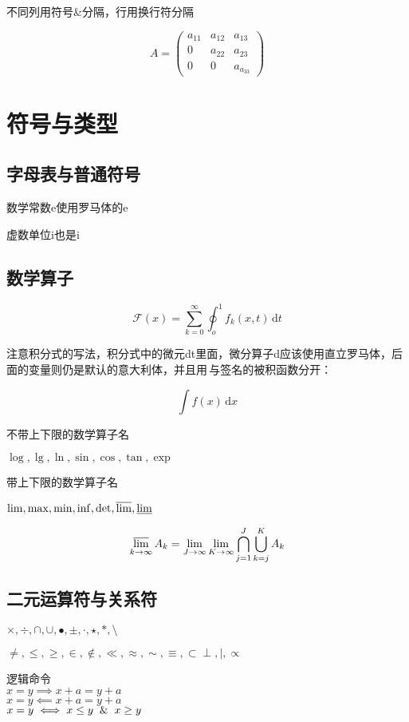 \documentclass[12pt]{article}
\begin{document}
不同列用符号\&分隔，行用换行符分隔

\[ A = \begin{pmatrix}
a_{11} & a_{12} & a_{13} \\
0 & a_{22}  & a_{23}  \\
0 & 0 & a_{a_{33}}
\end{pmatrix}
\]



\section{符号与类型}

\subsection{字母表与普通符号}
数学常数e使用罗马体的$\mathrm{e}$

虚数单位i也是$\mathrm{i}$

\subsection{数学算子}

\[
\mathcal{F}(x) = \sum_{k=0}^{\infty}
	\oint_o^1 f_k(x,t) \,\mathrm{d}t
	\]

注意积分式的写法，积分式中的微元dt里面，微分算子d应该使用直立罗马体，后面的变量则仍是默认的意大利体，并且用\,与签名的被积函数分开：

\[
 \int f(x) \,\mathrm{d}x
 \]
 
不带上下限的数学算子名

$\log,\lg,\ln,\sin,\cos,\tan,\exp$

带上下限的数学算子名

$\lim,\max,\min,\inf,\det,\varlimsup,\varliminf$

\begin{equation}
	\varlimsup_{k\to\infty} A_k = \lim_{J\to\infty}
	\lim_{K\to\infty}
	\bigcap_{j=1}^J \bigcup_{k=j}^K A_k
\end{equation}

\subsection{二元运算符与关系符}

$\times,\div,\cap,\cup,\bullet,\pm,\cdot,
\star,\ast,\setminus$

$\ne,\le,\ge,\in,\notin,\ll,\approx,\sim,\equiv,\subset\perp,\mid,\propto$


逻辑命令\\
$x=y \implies x+a = y+a$ \\
$x=y \impliedby x+a = y+a$ \\
$x=y \iff x\le y \And x\ge y$ \\	
	
\end{document}
